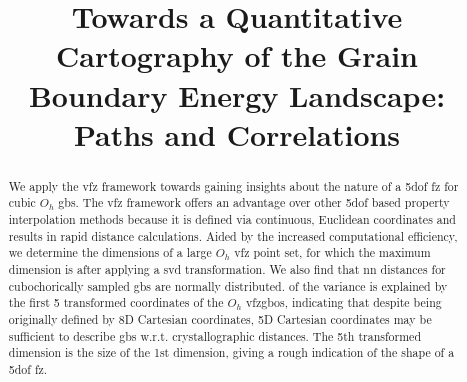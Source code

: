 \documentclass[final,twocolumn,12pt]{elsarticle}
\begin{document}
	
	\sloppy %
	
	\begin{frontmatter}
		
        \title{Towards a Quantitative Cartography of the Grain Boundary Energy Landscape: Paths and Correlations}
		
		
		
		\begin{abstract}
			We apply the \gls{vfz} framework towards gaining insights about the nature of a \gls{5dof} \gls{fz} for cubic $O_h$ \glspl{gb}. The \gls{vfz} framework offers an advantage over other \gls{5dof} based property interpolation methods because it is defined via continuous, Euclidean coordinates and results in rapid distance calculations. %
			Aided by the increased computational efficiency, we determine the dimensions of a large $O_h$ \gls{vfz} point set, for which the maximum dimension is \dimOne{} after applying a \gls{svd} transformation. We also find that \gls{nn} distances for cubochorically sampled \glspl{gb} are normally distributed. \percExplained{} of the variance is explained by the first 5 transformed coordinates of the $O_h$ \glspl{vfzgbo}, indicating that despite being originally defined by 8D Cartesian coordinates, 5D Cartesian coordinates may be sufficient to describe \glspl{gb} w.r.t. crystallographic distances. The 5th transformed dimension is \percFiveVsOne{} the size of the 1st dimension, giving a rough indication of the shape of a \gls{5dof} \gls{fz}. %

\end{abstract}
\end{frontmatter}
\end{document}
